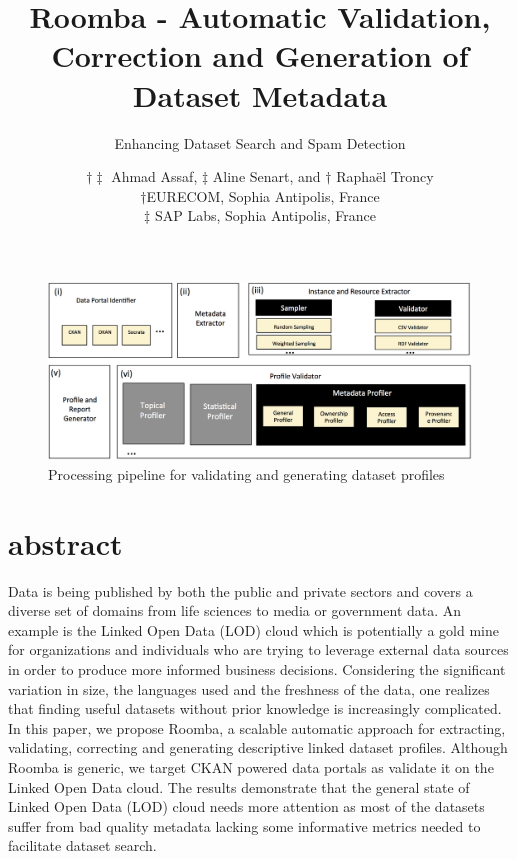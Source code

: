 \documentclass{sig-alternate}
\begin{document}

\title{Roomba - Automatic Validation, Correction and Generation of Dataset Metadata}
\subtitle{Enhancing Dataset Search and Spam Detection}

\author{\alignauthor $\dagger\ddagger$ Ahmad Assaf, $\ddagger$ Aline Senart, and $\dagger$ Rapha\"{e}l Troncy \\
\affaddr$\dagger${EURECOM, Sophia Antipolis, France} \\ \affaddr$\ddagger${ SAP Labs, Sophia Antipolis, France} \\
}

\maketitle
\begin{figure}[t!]
  \centering
    \includegraphics[scale=0.4]{figure-1_architecture.png}
  \caption{Processing pipeline for validating and generating dataset profiles}
  \label{fig:1}
\end{figure}

\section{abstract}
Data is being published by both the public and private sectors and covers a diverse set of domains from life sciences to media or government data. An example is the Linked Open Data (LOD) cloud which is potentially a gold mine for organizations and individuals who are trying to leverage external data sources in order to produce more informed business decisions. Considering the significant variation in size, the languages used and the freshness of the data, one realizes that finding useful datasets without prior knowledge is increasingly complicated. In this paper, we propose Roomba, a scalable automatic approach for extracting, validating, correcting and generating descriptive linked dataset profiles. Although Roomba is generic, we target CKAN powered data portals as validate it on the Linked Open Data cloud. The results demonstrate that the general state of Linked Open Data (LOD) cloud needs more attention as most of the datasets suffer from bad quality metadata lacking some informative metrics needed to facilitate dataset search.
\end{document}
